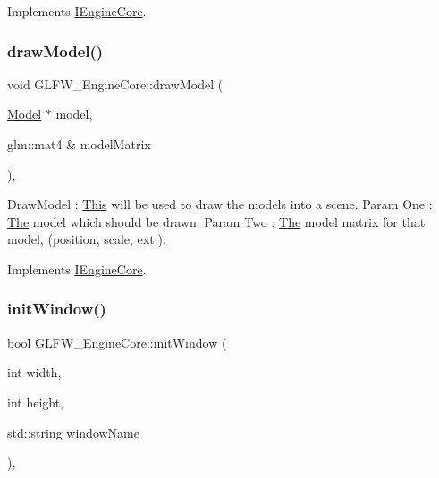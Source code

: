 Implements \mbox{\hyperlink{class_i_engine_core_af24745492d6a7c8bd410a6849fbaf854}{I\+Engine\+Core}}.

\mbox{\label{class_g_l_f_w___engine_core_a51f39fe1ceea2f8c47d7c8e89118139d}} 
\subsubsection{\texorpdfstring{draw\+Model()}{drawModel()}}
{\footnotesize\ttfamily void G\+L\+F\+W\+\_\+\+Engine\+Core\+::draw\+Model (\begin{DoxyParamCaption}\item[{\mbox{\hyperlink{class_model}{Model}} $\ast$}]{model,  }\item[{glm\+::mat4 \&}]{model\+Matrix }\end{DoxyParamCaption})\hspace{0.3cm}{\ttfamily [override]}, {\ttfamily [virtual]}}

Draw\+Model \+: \mbox{\hyperlink{class_this}{This}} will be used to draw the models into a scene. Param One \+: \mbox{\hyperlink{class_the}{The}} model which should be drawn. Param Two \+: \mbox{\hyperlink{class_the}{The}} model matrix for that model, (position, scale, ext.). 

Implements \mbox{\hyperlink{class_i_engine_core_a454b3f14b3a567852d891c7543edfef7}{I\+Engine\+Core}}.

\mbox{\label{class_g_l_f_w___engine_core_aa786131ec64e7ee6779c3ac1ee8507ce}} 
\subsubsection{\texorpdfstring{init\+Window()}{initWindow()}}
{\footnotesize\ttfamily bool G\+L\+F\+W\+\_\+\+Engine\+Core\+::init\+Window (\begin{DoxyParamCaption}\item[{int}]{width,  }\item[{int}]{height,  }\item[{std\+::string}]{window\+Name }\end{DoxyParamCaption})\hspace{0.3cm}{\ttfamily [override]}, {\ttfamily [virtual]}}

